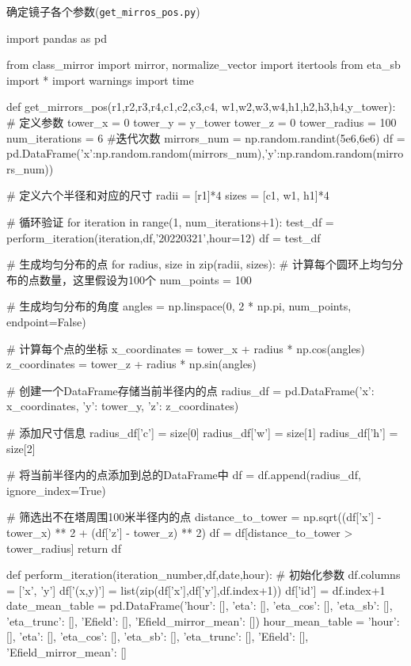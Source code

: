 \documentclass{article}
\numberwithin{equation}{subsection}
\begin{document}
确定镜子各个参数(\verb|get_mirros_pos.py|)
\begin{python}
import pandas as pd

from class_mirror import mirror, normalize_vector
import itertools
from eta_sb import *
import warnings
import time

def get_mirrors_pos(r1,r2,r3,r4,c1,c2,c3,c4,
                       w1,w2,w3,w4,h1,h2,h3,h4,y_tower):
    # 定义参数
    tower_x = 0
    tower_y = y_tower
    tower_z = 0
    tower_radius = 100
    num_iterations = 6 #迭代次数
    mirrors_num = np.random.randint(5e6,6e6)
    df = pd.DataFrame({'x':np.random.random(mirrors_num),'y':np.random.random(mirrors_num)})

    # 定义六个半径和对应的尺寸
    radii = [r1]*4
    sizes = [c1, w1, h1]*4

    # 循环验证
    for iteration in range(1, num_iterations+1):
        test_df = perform_iteration(iteration,df,'20220321',hour=12)
    df = test_df

    # 生成均匀分布的点
    for radius, size in zip(radii, sizes):
        # 计算每个圆环上均匀分布的点数量，这里假设为100个
        num_points = 100

        # 生成均匀分布的角度
        angles = np.linspace(0, 2 * np.pi, num_points, endpoint=False)

        # 计算每个点的坐标
        x_coordinates = tower_x + radius * np.cos(angles)
        z_coordinates = tower_z + radius * np.sin(angles)

        # 创建一个DataFrame存储当前半径内的点
        radius_df = pd.DataFrame({'x': x_coordinates, 'y': tower_y, 'z': z_coordinates})

        # 添加尺寸信息
        radius_df['c'] = size[0]
        radius_df['w'] = size[1]
        radius_df['h'] = size[2]

        # 将当前半径内的点添加到总的DataFrame中
        df = df.append(radius_df, ignore_index=True)

    # 筛选出不在塔周围100米半径内的点
    distance_to_tower = np.sqrt((df['x'] - tower_x) ** 2 + (df['z'] - tower_z) ** 2)
    df = df[distance_to_tower > tower_radius]
    return df

def perform_iteration(iteration_number,df,date,hour):
    # 初始化参数
    df.columns = ['x', 'y']
    df['(x,y)'] = list(zip(df['x'],df['y'],df.index+1))
    df['id'] = df.index+1
    date_mean_table = pd.DataFrame({'hour': [], 'eta': [], 'eta_cos': [], 'eta_sb': [], 'eta_trunc': [], 'Efield': [], 'Efield_mirror_mean': []})
    hour_mean_table = {'hour': [], 'eta': [], 'eta_cos': [], 'eta_sb': [], 'eta_trunc': [], 'Efield': [],
                       'Efield_mirror_mean': []}


\end{python}
\end{document}
